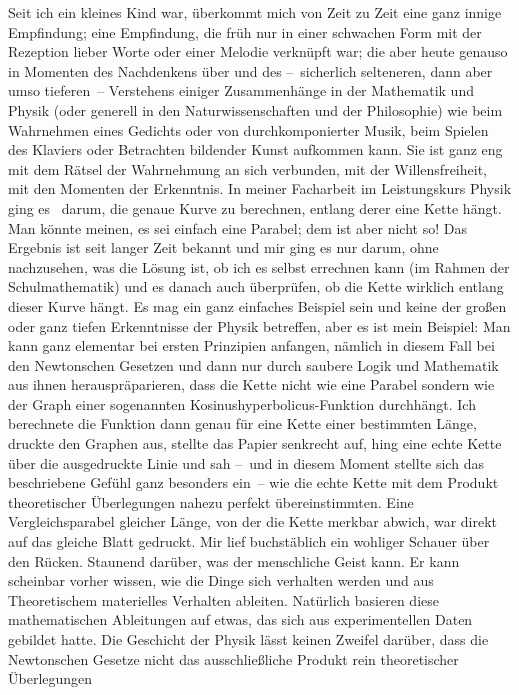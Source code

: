 Seit ich ein kleines Kind war, überkommt mich von Zeit zu Zeit eine ganz
  innige Empfindung; eine Empfindung, die früh nur in einer schwachen Form 
  mit der Rezeption lieber Worte oder einer Melodie verknüpft war;
  die aber heute genauso in Momenten des Nachdenkens über und des
  --~sicherlich selteneren, dann aber umso tieferen~-- Verstehens einiger
  Zusammenhänge in der Mathematik und Physik (oder generell in den
  Naturwissenschaften und der Philosophie) wie beim Wahrnehmen eines Gedichts
  oder von durchkomponierter Musik, beim Spielen des Klaviers oder Betrachten
  bildender Kunst aufkommen kann.
Sie ist ganz eng mit dem Rätsel der Wahrnehmung an sich verbunden, mit der
  Willensfreiheit, mit den Momenten der Erkenntnis.
In meiner Facharbeit im Leistungskurs Physik ging es \ua\ darum, die genaue
  Kurve zu berechnen, entlang derer eine Kette hängt. Man könnte meinen, es
  sei einfach eine Parabel; dem ist aber nicht so! Das Ergebnis ist seit
  langer Zeit bekannt und mir ging es nur darum, ohne nachzusehen, was die
  Lösung ist, ob ich es selbst errechnen kann (im Rahmen der Schulmathematik)
  und es danach auch überprüfen, ob die Kette wirklich entlang dieser Kurve hängt.
Es mag ein ganz einfaches Beispiel sein und keine der großen oder ganz tiefen
  Erkenntnisse der Physik betreffen, aber es ist mein Beispiel:
Man kann ganz elementar bei ersten Prinzipien anfangen, nämlich in diesem Fall
  bei den Newtonschen Gesetzen und dann nur durch saubere Logik und Mathematik
  aus ihnen herauspräparieren, dass die Kette nicht wie eine Parabel sondern
  wie der Graph einer sogenannten Kosinushyperbolicus-Funktion durchhängt.
Ich berechnete die Funktion dann genau für eine Kette einer bestimmten Länge,
  druckte den Graphen aus, stellte das Papier senkrecht auf, hing eine echte
  Kette über die ausgedruckte Linie und sah --~und in diesem Moment stellte
  sich das beschriebene Gefühl ganz besonders ein~-- wie die echte Kette mit
  dem Produkt theoretischer Überlegungen nahezu perfekt übereinstimmten.
Eine Vergleichsparabel gleicher Länge, von der die Kette merkbar abwich, war
  direkt auf das gleiche Blatt gedruckt.
Mir lief buchstäblich ein wohliger Schauer über den Rücken. Staunend darüber,
  was der menschliche Geist kann.
Er kann scheinbar vorher wissen, wie die Dinge sich verhalten werden und aus
  Theoretischem materielles Verhalten ableiten.
Natürlich basieren diese mathematischen Ableitungen auf etwas, das sich \ua
  aus experimentellen Daten gebildet hatte.
Die Geschicht der Physik lässt keinen Zweifel darüber, dass die Newtonschen
  Gesetze nicht das ausschließliche Produkt rein theoretischer Überlegungen
